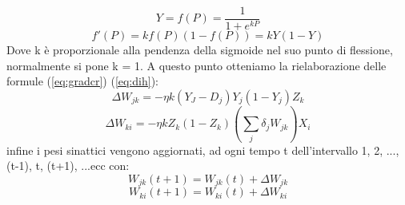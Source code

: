 \documentclass[10pt,a4paper]{article}
\begin{document}
\begin{equation}
Y = f(P) = \frac{1}{1+e^{kP}}
\end{equation}
\begin{equation}
f'(P) = kf(P)(1-f(P)) = kY(1-Y)
\end{equation}
Dove k è proporzionale alla pendenza della sigmoide nel suo punto di flessione, normalmente si pone k = 1.
A questo punto otteniamo la rielaborazione delle formule (\ref{eq:gradcr}) (\ref{eq:dih}):
\begin{equation}
\Delta W_{jk} = -\eta k (Y_J - D_j)Y_j(1-Y_j)Z_k
\end{equation} 
\begin{equation}
\Delta W_{ki} = -\eta k Z_k (1-Z_k)(\sum_j \delta_j W_{jk})X_i
\end{equation} 
infine i pesi sinattici vengono aggiornati, ad ogni tempo t dell'intervallo 1, 2, ..., (t-1), t, (t+1), ...ecc con:
\begin{equation}
W_{jk}(t+1) = W_{jk}(t) + \Delta W_{jk}
\end{equation}
\begin{equation}
W_{ki}(t+1) = W_{ki}(t) + \Delta W_{ki}
\end{equation} 
\end{document}

